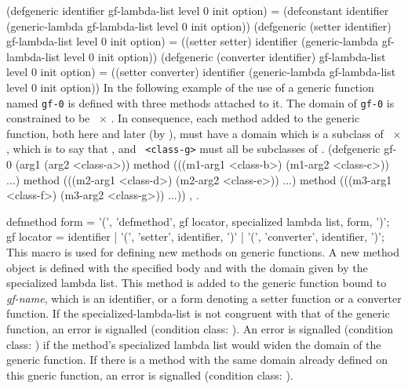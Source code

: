 \begin{optDefinition}
\savesyntax{}\vbox{\small\syntax
(defgeneric identifier
  gf-lambda-list {level 0 init option})
   = (defconstant identifier
       (generic-lambda
         gf-lambda-list {level 0 init option}))
(defgeneric (setter identifier)
  gf-lambda-list {level 0 init option})
   = ((setter setter) identifier
       (generic-lambda
         gf-lambda-list {level 0 init option}))
(defgeneric (converter identifier)
  gf-lambda-list {level 0 init option})
   = ((setter converter) identifier
       (generic-lambda
         gf-lambda-list {level 0 init option}))
\endsyntax}
\label{defgeneric-rewrite-rules}
%
\examples
In the following example of the use of  a generic
function named {\tt gf-0} is defined with three methods attached to
it.  The domain of {\tt gf-0} is constrained to be \
$\times$ {\tt <class-a>}.  In consequence, each method added to the
generic function, both here and later (by \macroref{defmethod}), must have
a domain which is a subclass of \classref{object}\ $\times$ {\tt <class-a>},
which is to say that {\tt <class-c>}, {\tt <class-e>} and {\tt
<class-g>} must all be subclasses of {\tt <class-a>}.
%
{\small\syntax
(defgeneric gf-0 (arg1 (arg2 <class-a>))
  method (((m1-arg1 <class-b>) (m1-arg2 <class-c>)) ...)
  method (((m2-arg1 <class-d>) (m2-arg2 <class-e>)) ...)
  method (((m3-arg1 <class-f>) (m3-arg2 <class-g>)) ...))
\endsyntax}
%
\seealso%
, .

\Syntax
\savesyntax{}\vbox{\small\syntax
defmethod form
   = '(', 'defmethod', gf locator,
     specialized lambda list,
     {form}, ')';
gf locator
   = identifier
   | '(', 'setter', identifier, ')'
   | '(', 'converter', identifier, ')';
\endsyntax}
%
\remarks%
This macro is used for defining new methods on generic functions.  A new method
object is defined with the specified body and with the domain given by the
specialized lambda list.  This method is added to the generic function bound to
{\em gf-name\/}, which is an identifier, or a form denoting a setter function or
a converter function. If the specialized-lambda-list is not congruent with that
of the generic function, an error is signalled (condition class:
\conditionref{non-congruent-lambda-lists}).
An error is signalled (condition class:
)
if the method's specialized lambda list would widen the domain of the generic
function.  If there is a method with the same domain already defined on this
gneric function, an error is signalled (condition class:
).


\end{optDefinition}
